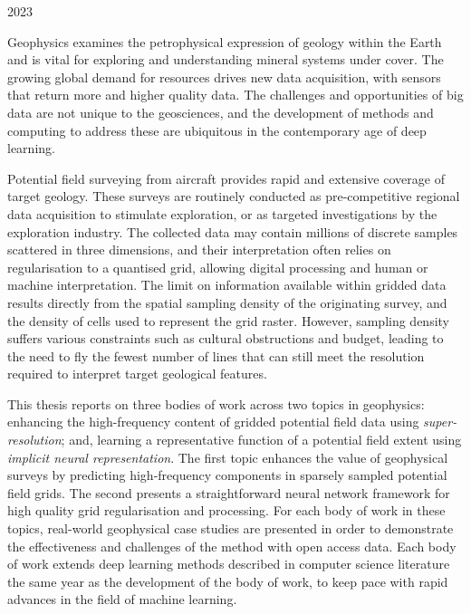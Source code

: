 \documentclass[12pt,a4paper,notitlepage]{report} %
\begin{document}
\begin{titlepage}
    \vspace*{\fill}
    2023
\end{titlepage}

\shipout\null

\setcounter{page}{1}

Geophysics examines the petrophysical expression of geology within the Earth and is vital for exploring and understanding mineral systems under cover.
The growing global demand for resources drives new data acquisition, with sensors that return more and higher quality data.
The challenges and opportunities of big data are not unique to the geosciences, and the development of methods and computing to address these are ubiquitous in the contemporary age of deep learning.

Potential field surveying from aircraft provides rapid and extensive coverage of target geology.
These surveys are routinely conducted as pre-competitive regional data acquisition to stimulate exploration, or as targeted investigations by the exploration industry.
The collected data may contain millions of discrete samples scattered in three dimensions, and their interpretation often relies on regularisation to a quantised grid, allowing digital processing and human or machine interpretation.
The limit on information available within gridded data results directly from the spatial sampling density of the originating survey, and the density of cells used to represent the grid raster.
However, sampling density suffers various constraints such as cultural obstructions and budget, leading to the need to fly the fewest number of lines that can still meet the resolution required to interpret target geological features.

This thesis reports on three bodies of work across two topics in geophysics: enhancing the high-frequency content of gridded potential field data using \emph{super-resolution}; and, learning a representative function of a potential field extent using \emph{implicit neural representation}.
The first topic enhances the value of geophysical surveys by predicting high-frequency components in sparsely sampled potential field grids.
The second presents a straightforward neural network framework for high quality grid regularisation and processing.
For each body of work in these topics, real-world geophysical case studies are presented in order to demonstrate the effectiveness and challenges of the method with open access data.
Each body of work extends deep learning methods described in computer science literature the same year as the development of the body of work, to keep pace with rapid advances in the field of machine learning.
\end{document}
